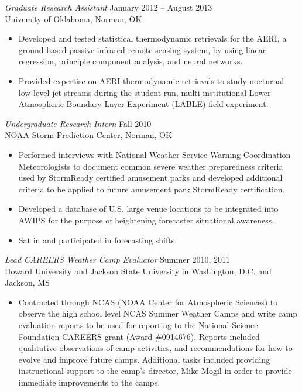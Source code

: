 \documentclass[10pt]{res} %
\begin{document}
\begin{resume}
{\sl Graduate Research Assistant} \hfill January 2012 -- August 2013 \\
University of Oklahoma, Norman, OK
\begin{itemize} \itemsep 2pt %
\item Developed and tested statistical thermodynamic retrievals for the AERI, a ground-based passive infrared remote sensing system, by using linear regression, principle component analysis, and neural networks.
\item Provided expertise on AERI thermodynamic retrievals to study nocturnal low-level jet streams during the student run, multi-institutional Lower Atmospheric Boundary Layer Experiment (LABLE) field experiment.
\end{itemize}

{\sl Undergraduate Research Intern} \hfill Fall 2010 \\ 
NOAA Storm Prediction Center, Norman, OK 
\begin{itemize} \itemsep 2pt %
\item Performed interviews with National Weather Service Warning Coordination Meteorologists to document common severe weather preparedness criteria used by StormReady certified amusement parks and developed additional criteria to be applied to future amusement park StormReady certification.
\item Developed a database of U.S. large venue locations to be integrated into AWIPS for the purpose of heightening forecaster situational awareness.
\item Sat in and participated in forecasting shifts.
\end{itemize} 

{\sl Lead CAREERS Weather Camp Evaluator} \hfill Summer 2010, 2011 \\
Howard University and Jackson State University in Washington, D.C. and Jackson, MS
\begin{itemize} \itemsep 2pt %
\item Contracted through NCAS (NOAA Center for Atmospheric Sciences) to observe the high school level NCAS Summer Weather Camps and write camp evaluation reports to be used for reporting to the National Science Foundation CAREERS grant (Award \#0914676). Reports included qualitative observations of camp activities, and recommendations for how to evolve and improve future camps.  Additional tasks included providing instructional support to the camp's director, Mike Mogil in order to provide immediate improvements to the camps.
\end{itemize} 


\end{resume}
\end{document}
